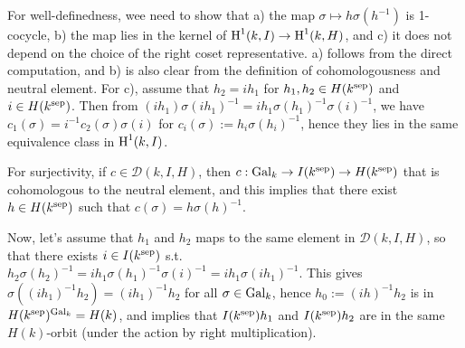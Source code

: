 \begin{problem}
For well-definedness, wee need to show that a) the map $\sigma \mapsto h\sigma(h^{-1})$ is 1-cocycle,
b) the map lies in the kernel of $\operatorname{\mathrm{H}}^{1}(k, I) \to \operatorname{\mathrm{H}}^1(k, H)$, and c)
it does not depend on the choice of the right coset representative.
a) follows from the direct computation, and b) is also clear from the definition of cohomologousness and neutral element.
For c), assume that $h_2 = ih_1$ for $h_1, h_2 \in H(k^{\operatorname{\mathrm{sep}}})$ and $i \in H(k^{\operatorname{\mathrm{sep}}})$.
Then from $(ih_1)\sigma(ih_1)^{-1} = i h_1 \sigma(h_1)^{-1} \sigma(i)^{-1}$, we have $c_1(\sigma) = i^{-1} c_{2}(\sigma) \sigma(i)$
for $c_i(\sigma):= h_i \sigma(h_i)^{-1}$, hence they lies in the same equivalence class in $\operatorname{\mathrm{H}}^{1}(k, I)$.

For surjectivity, if $c \in \mathcal{D}(k, I, H)$, then $c: \operatorname{\mathrm{Gal}}_k \to I(k^{\operatorname{\mathrm{sep}}}) \to H(k^{\operatorname{\mathrm{sep}}})$ that is cohomologous to the neutral element,
and this implies that there exist $h \in H(k^{\operatorname{\mathrm{sep}}})$ such that $c(\sigma) = h\sigma(h)^{-1}$.

Now, let's assume that $h_1$ and $h_2$ maps to the same element in $\mathcal{D}(k, I, H)$, so that there exists $i \in I(k^{\operatorname{\mathrm{sep}}})$ s.t.
$h_{2}\sigma(h_{2})^{-1} = ih_{1}\sigma(h_{1})^{-1}\sigma(i)^{-1} = ih_{1} \sigma(ih_1)^{-1}$.
This gives $\sigma((ih_{1})^{-1}h_{2}) = (ih_{1})^{-1}h_{2}$ for all $\sigma \in \operatorname{\mathrm{Gal}}_k$, hence $h_{0}:=(ih)^{-1}h_{2}$ is in $H(k^{\operatorname{\mathrm{sep}}})^{\operatorname{\mathrm{Gal}}_k} = H(k)$,
and implies that $I(k^{\operatorname{\mathrm{sep}}})h_1$ and $I(k^{\operatorname{\mathrm{sep}}})h_2$ are in the same $H(k)$-orbit (under the action by right multiplication).

\end{problem}

\begin{problem} \notfinish
\end{problem}

\begin{problem} \notfinish
\end{problem}


\begin{problem} \notfinish
\end{problem}

\begin{problem} \notfinish
\end{problem}

\begin{problem} \notfinish
\end{problem}

\begin{problem} \notfinish
\end{problem}